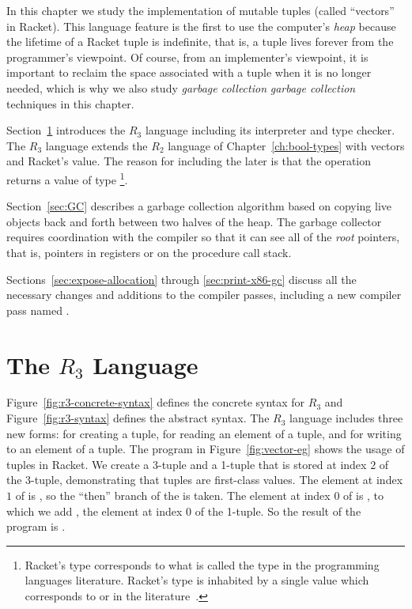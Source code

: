 \documentclass[11pt]{book}
\begin{document}
In this chapter we study the implementation of mutable tuples (called
``vectors'' in Racket). This language feature is the first to use the
computer's \emph{heap} because the lifetime of a Racket tuple is
indefinite, that is, a tuple lives forever from the programmer's
viewpoint. Of course, from an implementer's viewpoint, it is important
to reclaim the space associated with a tuple when it is no longer
needed, which is why we also study \emph{garbage collection}
\emph{garbage collection}
techniques in this chapter.

Section~\ref{sec:r3} introduces the $R_3$ language including its
interpreter and type checker. The $R_3$ language extends the $R_2$
language of Chapter~\ref{ch:bool-types} with vectors and Racket's
 value. The reason for including the later is that the
 operation returns a value of type
\footnote{Racket's  type corresponds to what is
  called the  type in the programming languages
  literature. Racket's  type is inhabited by a single value
   which corresponds to  or \code{()} in the
  literature~\citep{Pierce:2002hj}.}.

Section~\ref{sec:GC} describes a garbage collection algorithm based on
copying live objects back and forth between two halves of the
heap. The garbage collector requires coordination with the compiler so
that it can see all of the \emph{root} pointers, that is, pointers in
registers or on the procedure call stack.

Sections~\ref{sec:expose-allocation} through \ref{sec:print-x86-gc}
discuss all the necessary changes and additions to the compiler
passes, including a new compiler pass named .

\section{The $R_3$ Language}
\label{sec:r3}

Figure~\ref{fig:r3-concrete-syntax} defines the concrete syntax for
$R_3$ and Figure~\ref{fig:r3-syntax} defines the abstract syntax.  The
$R_3$ language includes three new forms:  for creating a
tuple,  for reading an element of a tuple, and
 for writing to an element of a tuple. The program
in Figure~\ref{fig:vector-eg} shows the usage of tuples in Racket. We
create a 3-tuple  and a 1-tuple that is stored at index $2$ of
the 3-tuple, demonstrating that tuples are first-class values.  The
element at index $1$ of  is , so the ``then'' branch
of the  is taken.  The element at index $0$ of  is
, to which we add , the element at index $0$ of the
1-tuple. So the result of the program is .
\end{document}
